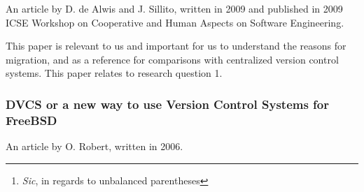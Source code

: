 \documentclass{llncs}
\begin{document}
An article by D. de Alwis and J. Sillito, written in 2009 and published in 
2009 ICSE Workshop on Cooperative and Human Aspects on Software
Engineering.

\begin{abstract}
 Version control systems are essential for co-ordinating work on a software
 project. A number of open- and closed-source projects are proposing to
 move, or have already moved, their source code repositories from a
 centralized version control system (CVCS) to a decentralized version
 control system (DVCS). In this paper we summarize the differences between a
 CVCS and a DVCS, and describe some of the rationales and perceived benefits
 offered by projects to justify the transition.
\end{abstract}

This paper is relevant to us and important for us to understand the reasons
for migration, and as a reference for comparisons with centralized version 
control systems. This paper relates to research question 1.

\subsubsection{DVCS or a new way to use Version Control Systems for FreeBSD}

An article by O. Robert, written in 2006.

\begin{abstract}
 FreeBSD, like many open source projects, uses CVS as its main versioon
 control system (VCS), which is an extended history of all modifications
 made since the beginning of the project in 1993. CVS is a cornerstone of
 FreeBSD in two ways: not only does it record the history of the project,
 but it is a fundamental tool for coordinating the development of the
 FreeBSD operating system.

 CVS is built around the concept of centralised repository, which has a
 number of limitations.

 Recently, a new type of VCS has arisen: Distributed VCS, one of the first
 being BK from BitMover, Inc. Better known from the controversy it generated
 when Linus Torvalds started using it, it has nonetheless changed the way
 some people develop software.

 This paper explores the area of distributed VCS. We analyse two of them
 (Arch in its Bazaar incarnation and Mercuriel and try to show how such a
 tool could help further FreeBSD development, both as a tool and as a new
 development process.\footnote{
  \emph{Sic}, in regards to unbalanced parentheses
 }
\end{abstract}
\end{document}

